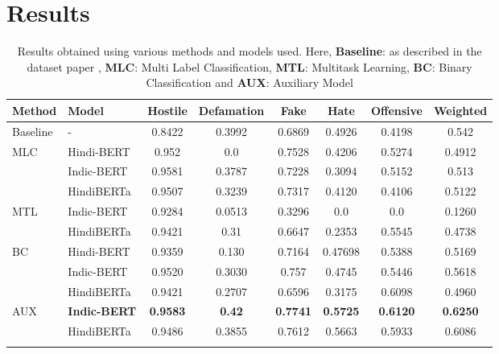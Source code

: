 \documentclass[runningheads]{llncs}
\begin{document}
\section{Results}
\begin{table}[bt]
\caption{\label{tab:table-name-2}Results obtained using various methods and models used. Here, \textbf{Baseline}: as described in the dataset paper \cite{bhardwaj2020hostility}, \textbf{MLC}: Multi Label Classification, \textbf{MTL}: Multitask Learning,  \textbf{BC}: Binary Classification and \textbf{AUX}: Auxiliary Model}
\begin{tabularx}{\textwidth}{llcccccc}
\hline
Method & Model               & Hostile           & Defamation        & Fake              &
Hate              & Offensive         & Weighted          \\
\hline
Baseline     & -          & 0.8422            & 0.3992            & 0.6869            & 0.4926           & 0.4198            & 0.542          \\
\hline

MLC    & Hindi-BERT          & 0.952           & 0.0               & 0.7528            & 0.4206            & 0.5274           & 0.4912           \\
       & Indic-BERT          & 0.9581           & 0.3787           & 0.7228          & 0.3094        & 0.5152           & 0.513             \\
       & HindiBERTa             & 0.9507            & 0.3239            & 0.7317            & 0.4120            & 0.4106           & 0.5122            \\
       \hline
MTL    & Indic-BERT          & 0.9284           & 0.0513           & 0.3296           & 0.0               & 0.0               & 0.1260           \\
       & HindiBERTa             & 0.9421           & 0.31              & 0.6647            & 0.2353            & 0.5545            & 0.4738            \\
       \hline
BC     & Hindi-BERT          & 0.9359            & 0.130             & 0.7164            & 0.47698           & 0.5388            & 0.5169            \\
       & Indic-BERT          & 0.9520           & 0.3030            & 0.757             & 0.4745            & 0.5446           & 0.5618            \\
       & HindiBERTa             & 0.9421           & 0.2707           & 0.6596           & 0.3175          & 0.6098            & 0.4960            \\
\hline
AUX    & \textbf{Indic-BERT} & \textbf{0.9583} & \textbf{0.42} & \textbf{0.7741} & \textbf{0.5725} & \textbf{0.6120} & \textbf{0.6250} \\
       & HindiBERTa             & 0.9486          & 0.3855          & 0.7612          & 0.5663          & 0.5933          & 0.6086\\
       \hline\\
\end{tabularx}
\end{table}
\end{document}

